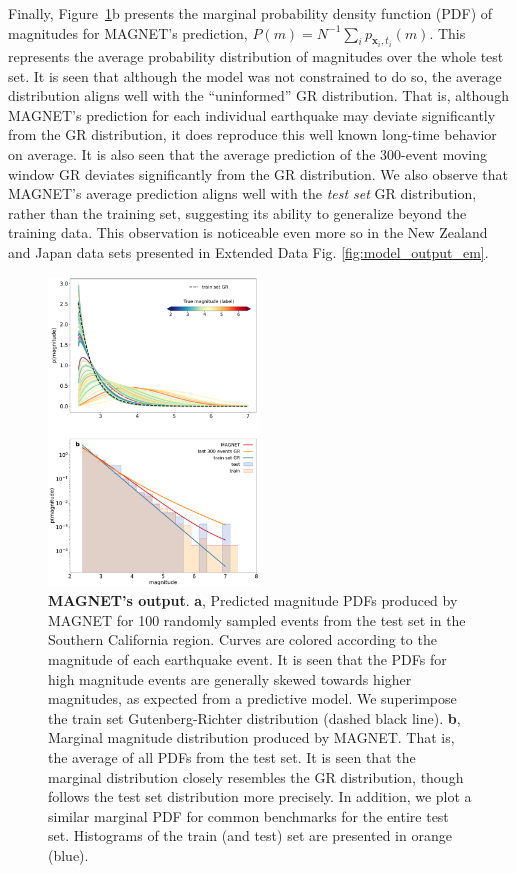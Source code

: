 \documentclass[pdflatex]{sn-jnl}
\begin{document}
Finally, Figure~\ref{fig:model_output}b presents the marginal probability density function (PDF) of magnitudes for MAGNET's prediction, $P(m)=N^{-1}\sum_i p_{\textbf{x}_i, t_i}(m)$. This represents the average probability distribution of magnitudes over the whole test set. It is seen that although the model was not constrained to do so, the average distribution aligns well with the ``uninformed'' GR distribution. That is, although MAGNET's prediction for each individual earthquake may deviate significantly from the GR distribution, it does reproduce this well known long-time behavior on average. It is also seen that the average prediction of the 300-event moving window GR deviates significantly from the GR distribution. We also observe that MAGNET's average prediction aligns well with the \emph{test set} GR distribution, rather than the training set, suggesting its ability to generalize beyond the training data. This observation is noticeable even more so in the New Zealand and Japan data sets presented in Extended Data Fig. \ref{fig:model_output_em}.

\begin{figure}[h!]
    \centering
    \includegraphics[width=0.5\textwidth]{figures/raw_results.pdf}
    \caption{
        \textbf{MAGNET's output}. \textbf{a}, Predicted magnitude PDFs produced by MAGNET for 100 randomly sampled events from the test set in the Southern California region. Curves are colored according to the magnitude of each earthquake event. It is seen that the PDFs for high magnitude events are generally skewed towards higher magnitudes, as expected from a predictive model. We superimpose the train set Gutenberg-Richter distribution (dashed black line).  \textbf{b}, Marginal magnitude distribution produced by MAGNET. That is, the average of all PDFs from the test set. It is seen that the marginal distribution closely resembles the GR distribution, though follows the test set distribution more precisely. In addition, we plot a similar marginal PDF for common benchmarks for the entire test set. Histograms of the train (and test) set are presented in orange (blue).
    }
    \label{fig:model_output}
\end{figure}
\end{document}
